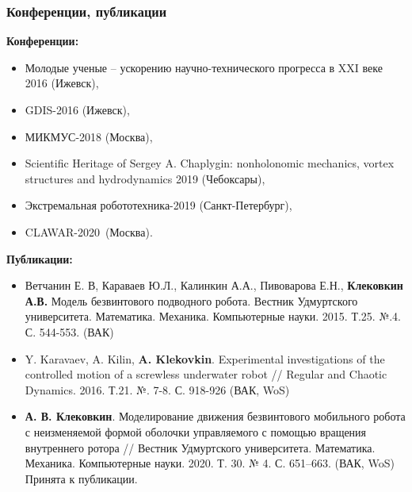 \begin{frame}[shrink=25]
\frametitle{Конференции, публикации}

\textbf{Конференции:} 

\begin{itemize}
	
\item Молодые ученые -- ускорению научно-технического прогресса в XXI веке 2016 (Ижевск),

\item GDIS-2016 (Ижевск), 

\item МИКМУС-2018 (Москва), 

\item Scientific Heritage of Sergey A. Chaplygin: nonholonomic mechanics, vortex structures and hydrodynamics 2019 (Чебоксары), 

\item Экстремальная робототехника-2019  (Санкт-Петербург), 

\item CLAWAR-2020~(Москва).

\end{itemize}

\textbf{Публикации:}
\begin{itemize}

\item Ветчанин Е. В, Караваев Ю.Л., Калинкин А.А., Пивоварова Е.Н., \textbf{Клековкин А.В.} Модель безвинтового подводного робота. Вестник Удмуртского университета. Математика. Механика. Компьютерные науки. 2015. Т.25. №.4. С. 544-553. (ВАК)

\item Y. Karavaev, A. Kilin, \textbf{A. Klekovkin}. Experimental investigations of the controlled motion of a screwless underwater robot // Regular and Chaotic Dynamics. 2016. Т.21. №. 7-8. С. 918-926 (ВАК, WoS)


\item \textbf{А. В. Клековкин}. Моделирование движения безвинтового мобильного робота с неизменяемой формой оболочки управляемого с помощью вращения внутреннего ротора // Вестник Удмуртского университета. Математика. Механика. Компьютерные науки. 2020. Т. 30. № 4. С. 651--663. (ВАК, WoS) Принята к публикации.



\end{itemize}
\end{frame}
